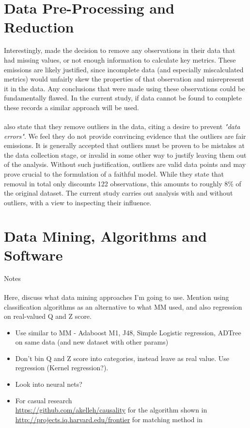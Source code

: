 \section{Data Pre-Processing and Reduction}
{Interestingly, \cite{moldovan2015learning} made the decision to remove any observations in their data that had missing values, or not enough information to calculate key metrics. These emissions are likely justified, since incomplete data (and especially miscalculated metrics) would unfairly skew the properties of that observation and misrepresent it in the data. Any conclusions that were made using these observations could be fundamentally flawed. In the current study, if data cannot be found to complete these records a similar approach will be used. \\\\
\cite{moldovan2015learning} also state that they remove outliers in the data, citing a desire to prevent {\it "data errors"}. We feel they do not provide convincing evidence that the outliers are fair emissions. It is generally accepted that outliers must be proven to be mistakes at the data collection stage, or invalid in some other way to justify leaving them out of the analysis. Without such justification, outliers are valid data points and may prove crucial to the formulation of a faithful model. While they state that removal in total only discounts 122 observations, this amounts to roughly 8\% of the original dataset. The current study carries out analysis with and without outliers, with a view to inspecting their influence. 
\section{Data Mining, Algorithms and Software}
Notes \\\\
Here, discuss what data mining approaches I'm going to use. Mention using classification algorithms as an alternative to what MM used, and also regression on real-valued Q and Z score.
\begin{itemize}
\item{Use similar to MM - Adaboost M1, J48, Simple Logistic regression, ADTree on same data (and new dataset with other params)}
\item{Don't bin Q and Z score into categories, instead leave as real value. Use regression (Kernel regression?).}
\item{Look into neural nets?  }
\item{For casual research}\\
{\url {https://github.com/akelleh/causality} for the algorithm shown in \cite{pearl1995theory}}
{\url{http://projects.iq.harvard.edu/frontier} for matching method in \cite{king2014balance}}


\end{itemize}}
